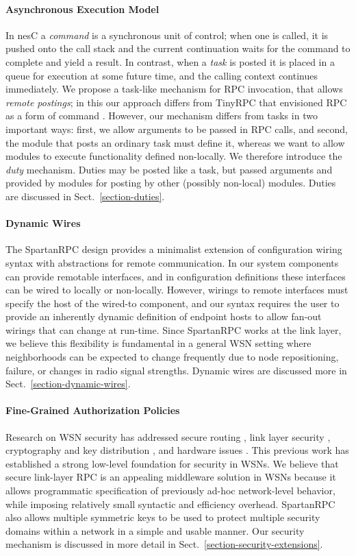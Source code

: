 \paragraph{Asynchronous Execution Model} In nesC a \emph{command} is a synchronous unit of
control; when one is called, it is pushed onto the call stack and the current continuation waits
for the command to complete and yield a result. In contrast, when a \emph{task} is posted it is
placed in a queue for execution at some future time, and the calling context continues
immediately. We propose a task-like mechanism for RPC invocation, that allows \emph{remote
  postings}; in this our approach differs from TinyRPC that envisioned RPC as a form of command
\cite{may-tinyrpc-2007}. However, our mechanism differs from tasks in two important ways: first,
we allow arguments to be passed in RPC calls, and second, the module that posts an ordinary task
must define it, whereas we want to allow modules to execute functionality defined non-locally.
We therefore introduce the \emph{duty} mechanism. Duties may be posted like a task, but passed
arguments and provided by modules for posting by other (possibly non-local) modules. Duties are
discussed in Sect.~\ref{section-duties}.

\paragraph{Dynamic Wires} The SpartanRPC design provides a minimalist extension of configuration
wiring syntax with abstractions for remote communication. In our system components can provide
remotable interfaces, and in configuration definitions these interfaces can be wired to locally
or non-locally. However, wirings to remote interfaces must specify the host of the wired-to
component, and our syntax requires the user to provide an inherently dynamic definition of
endpoint hosts to allow fan-out wirings that can change at run-time. Since SpartanRPC works at
the link layer, we believe this flexibility is fundamental in a general WSN setting where
neighborhoods can be expected to change frequently due to node repositioning, failure, or
changes in radio signal strengths. Dynamic wires are discussed more in
Sect.~\ref{section-dynamic-wires}.

\paragraph{Fine-Grained Authorization Policies} Research on WSN security has addressed secure
routing \cite{senroute-ahnj03}, link layer security \cite{karlog-tinysec-2004}, cryptography
\cite{bertoni-2006} and key distribution \cite{camtepe-bulent-05}, and hardware issues
\cite{perrig-2004}. This previous work has established a strong low-level foundation for
security in WSNs. We believe that secure link-layer RPC is an appealing middleware solution in
WSNs because it allows programmatic specification of previously ad-hoc network-level behavior,
while imposing relatively small syntactic and efficiency overhead. SpartanRPC also allows
multiple symmetric keys to be used to protect multiple security domains within a network in a
simple and usable manner. Our security mechanism is discussed in more detail in
Sect.~\ref{section-security-extensions}.
